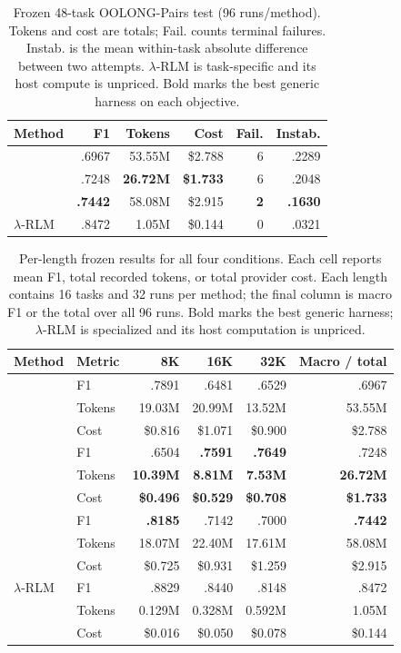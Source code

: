 \begin{table}[ht]
\centering\small
\setlength{\tabcolsep}{3.5pt}
\begin{tabular}{@{}lrrrrr@{}}
\toprule
Method & F1 & Tokens & Cost & Fail. & Instab. \\
\midrule
\hzero{}      & .6967 & 53.55M & \$2.788 & 6 & .2289 \\
\hzerostar{}  & .7248 & \textbf{26.72M} & \textbf{\$1.733} & 6 & .2048 \\
\shrlm{}      & \textbf{.7442} & 58.08M & \$2.915 & \textbf{2} & \textbf{.1630} \\
$\lambda$-RLM & .8472 &  1.05M & \$0.144 & 0 & .0321 \\
\bottomrule
\end{tabular}
\caption{Frozen 48-task OOLONG-Pairs test (96 runs/method). Tokens and cost are
totals; Fail. counts terminal failures. Instab. is the mean within-task absolute
difference between two attempts. $\lambda$-RLM is task-specific and its host
compute is unpriced. Bold marks the best generic harness on each objective.}
\label{tab:frozen48}
\end{table}

\begin{table}[ht]
\centering\scriptsize
\setlength{\tabcolsep}{3.2pt}
\renewcommand{\arraystretch}{1.02}
\begin{tabular}{@{}llrrrr@{}}
\toprule
Method & Metric & 8K & 16K & 32K & Macro / total \\
\midrule
\hzero{} & F1 & .7891 & .6481 & .6529 & .6967 \\
 & Tokens & 19.03M & 20.99M & 13.52M & 53.55M \\
 & Cost & \$0.816 & \$1.071 & \$0.900 & \$2.788 \\
\addlinespace[2pt]
\hzerostar{} & F1 & .6504 & \textbf{.7591} & \textbf{.7649} & .7248 \\
 & Tokens & \textbf{10.39M} & \textbf{8.81M} & \textbf{7.53M} & \textbf{26.72M} \\
 & Cost & \textbf{\$0.496} & \textbf{\$0.529} & \textbf{\$0.708} & \textbf{\$1.733} \\
\addlinespace[2pt]
\shrlm{} & F1 & \textbf{.8185} & .7142 & .7000 & \textbf{.7442} \\
 & Tokens & 18.07M & 22.40M & 17.61M & 58.08M \\
 & Cost & \$0.725 & \$0.931 & \$1.259 & \$2.915 \\
\addlinespace[2pt]
$\lambda$-RLM & F1 & .8829 & .8440 & .8148 & .8472 \\
 & Tokens & 0.129M & 0.328M & 0.592M & 1.05M \\
 & Cost & \$0.016 & \$0.050 & \$0.078 & \$0.144 \\
\bottomrule
\end{tabular}
\caption{Per-length frozen results for all four conditions. Each cell reports
mean F1, total recorded tokens, or total provider cost. Each length contains
16 tasks and 32 runs per method; the final column is macro F1 or the total over
all 96 runs. Bold marks the best generic harness; $\lambda$-RLM is specialized
and its host computation is unpriced.}
\label{tab:frozen48-length}
\end{table}

